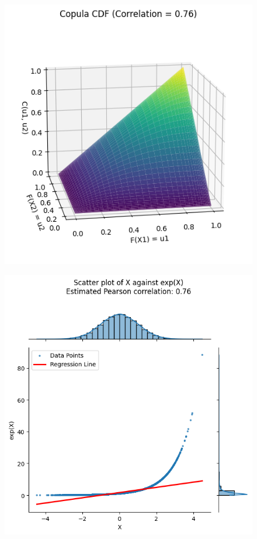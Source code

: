 \begin{figure}
    \begin{minipage}{0.45\textwidth}
        \centering
        \includegraphics[width=\textwidth]{3Theory/pictures/CorrelationEstimationExponential.png}
        \label{fig:CorrelationEstimationExponential}
    \end{minipage}
    \vfill
    \begin{minipage}{0.45\textwidth}
        \centering
        \includegraphics[width=\textwidth]{3Theory/pictures/exponentialDependenceScatterRet.png}

\end{minipage}
\end{figure}
